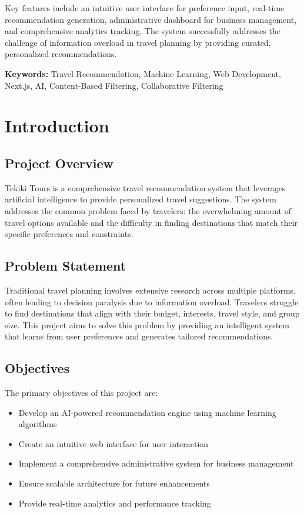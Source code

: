 \documentclass[12pt,a4paper]{article}
\begin{document}
Key features include an intuitive user interface for preference input, real-time recommendation generation, administrative dashboard for business management, and comprehensive analytics tracking. The system successfully addresses the challenge of information overload in travel planning by providing curated, personalized recommendations.

\textbf{Keywords:} Travel Recommendation, Machine Learning, Web Development, Next.js, AI, Content-Based Filtering, Collaborative Filtering

\newpage

\section{Introduction}

\subsection{Project Overview}
Tekiki Tours is a comprehensive travel recommendation system that leverages artificial intelligence to provide personalized travel suggestions. The system addresses the common problem faced by travelers: the overwhelming amount of travel options available and the difficulty in finding destinations that match their specific preferences and constraints.

\subsection{Problem Statement}
Traditional travel planning involves extensive research across multiple platforms, often leading to decision paralysis due to information overload. Travelers struggle to find destinations that align with their budget, interests, travel style, and group size. This project aims to solve this problem by providing an intelligent system that learns from user preferences and generates tailored recommendations.

\subsection{Objectives}
The primary objectives of this project are:
\begin{itemize}
    \item Develop an AI-powered recommendation engine using machine learning algorithms
    \item Create an intuitive web interface for user interaction
    \item Implement a comprehensive administrative system for business management
    \item Ensure scalable architecture for future enhancements
    \item Provide real-time analytics and performance tracking
\end{itemize}
\end{document}
